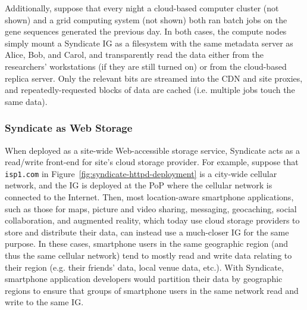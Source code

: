 Additionally, suppose that every night a cloud-based computer cluster (not shown) and a grid computing system (not shown) both ran batch jobs on the gene sequences generated the previous day.  In both cases, the compute nodes simply mount a Syndicate IG as a filesystem with the same metadata server as Alice, Bob, and Carol, and transparently read the data either from the researchers' workstations (if they are still turned on) or from the cloud-based replica server.  Only the relevant bits are streamed into the CDN and site proxies, and repeatedly-requested blocks of data are cached (i.e. multiple jobs touch the same data).

\subsubsection{Syndicate as Web Storage}

When deployed as a site-wide Web-accessible storage service, Syndicate acts as a read/write front-end for site's cloud storage provider.  For example, suppose that \texttt{isp1.com} in Figure~\ref{fig:syndicate-httpd-deployment} is a city-wide cellular network, and the IG is deployed at the PoP where the cellular network is connected to the Internet.  Then, most location-aware smartphone applications, such as those for maps, picture and video sharing, messaging, geocaching, social collaboration, and augmented reality, which today use cloud storage providers to store and distribute their data, can instead use a much-closer IG for the same purpose.  In these cases, smartphone users in the same geographic region (and thus the same cellular network) tend to mostly read and write data relating to their region (e.g. their friends' data, local venue data, etc.).  With Syndicate, smartphone application developers would partition their data by geographic regions to ensure that groups of smartphone users in the same network read and write to the same IG.


